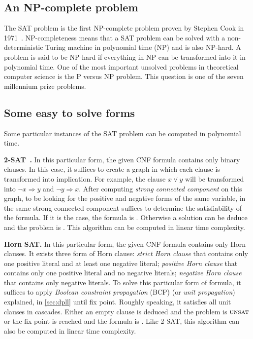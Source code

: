 \subsection{An NP-complete problem}
The SAT problem is the first NP-complete problem proven by Stephen Cook in 1971~\cite{cook1971complexity}.
NP-completeness means that a SAT problem can be solved with a non-deterministic Turing machine in polynomial time (NP) and is also NP-hard. A problem is said to be NP-hard if everything in NP can be transformed into it in polynomial time. 
One of the most important unsolved problems in theoretical computer science is the P versus NP problem.
This question is one of the seven millennium prize problems.

\subsection{Some easy to solve forms}

Some particular instances of the SAT problem can be computed in polynomial time.

\textbf{2-SAT~\cite{aspvall1979linear}.}
In this particular form, the given CNF formula contains only binary clauses.
In this case, it suffices to create a graph in which each clause is transformed into implication. For example, the clause $x \lor y$ will be transformed into $ \neg x \Rightarrow y$ and $\neg y \Rightarrow x$.
 After computing \emph{strong connected component} on this graph, to be looking for the positive and negative forms of the same variable, in the same  strong connected component suffices 
to determine the satisfiability of the formula.
 If it is the case, the formula is \unsat. Otherwise 
a solution can be deduce and the problem is \sat. This algorithm can be computed in linear time complexity.

\textbf{Horn SAT.} In this particular form, the given CNF formula contains only Horn clauses. It exists three form
of Horn clause: \emph{strict Horn clause} that contains only one positive literal and at least one negative literal;
\emph{positive Horn clause} that contains only one positive literal and no negative literals;
\emph{negative Horn clause} that contains only negative literals.
To solve this particular form of formula, it suffices to  apply \emph{Boolean constraint propagation} (BCP) (or \emph{unit propagation}) explained, in \cref{sec:dpll} until fix point.
Roughly speaking, it satisfies all unit clauses in cascades. Either an empty clause is deduced and the problem
is $\textsc{unsat}$ or the fix point is reached and the formula is \sat. Like 2-SAT, this algorithm can also be computed
in linear time complexity.

